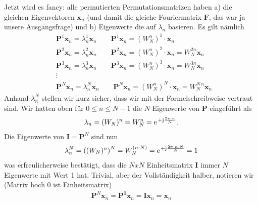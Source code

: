 Jetzt wird es fancy: alle permutierten Permutationsmatrizen haben a)
die gleichen Eigenvektoren $\bm{x}_n$ (und damit die gleiche Fouriermatrix $\bm{F}$,
das war ja unsere Ausgangsfrage) und b) Eigenwerte die auf $\lambda_n$ basieren.
Es gilt nämlich
\begin{align}
&\bm{P}^1 \bm{x}_n = \lambda_n^1 \bm{x}_n
\qquad
\bm{P}^1 \bm{x}_n = (W_N^n)^{1} \cdot \bm{x}_n
\nonumber\\
&\bm{P}^2 \bm{x}_n = \lambda_n^2 \bm{x}_n
\qquad
\bm{P}^2 \bm{x}_n = (W_N^n)^{2} \cdot \bm{x}_n = W_N^{2 n} \bm{x}_n
\nonumber\\
&\bm{P}^3 \bm{x}_n = \lambda_n^3 \bm{x}_n
\qquad
\bm{P}^3 \bm{x}_n = (W_N^n)^{3} \cdot \bm{x}_n = W_N^{3 n} \bm{x}_n
\nonumber\\
&\vdots\nonumber\\
&\bm{P}^N \bm{x}_n = \lambda_n^N \bm{x}_n
\qquad
\bm{P}^N \bm{x}_n = (W_N^n)^{N} \cdot \bm{x}_n = W_N^{N\,n} \bm{x}_n
\end{align}
%
Anhand $\lambda_n^N$ stellen wir kurz sicher, dass wir mit der Formelschreibweise
vertraut sind.
%
Wir hatten oben für $0\leq n \leq N-1$ die $N$ Eigenwerte von $\bm{P}$
eingeführt als
\begin{align}
\lambda_n =(W_N)^n = W_N^n = \e^{+\im\frac{2\pi\cdot n}{N}}.
\end{align}
Die Eigenwerte von $\bm{I} = \bm{P}^N$ sind nun
\begin{align}
\lambda_n^N =\left((W_N)^n\right)^N = W_N^{(n \cdot N)} = \e^{+\im\frac{2\pi\cdot n \cdot N}{N}} = 1
\end{align}
was erfreulicherweise bestätigt, dass die $NxN$ Einheitsmatrix $\bm{I}$ immer
$N$ Eigenwerte mit Wert 1 hat.
Trivial, aber der Vollständigkeit halber, notieren wir (Matrix hoch 0 ist Einheitsmatrix)
\begin{align}
\bm{P}^N \bm{x}_n = \bm{P}^0 \bm{x}_n = \bm{I} \bm{x}_n = \bm{x}_n
\end{align}

